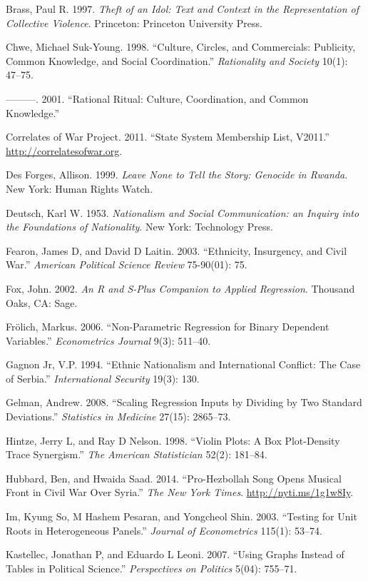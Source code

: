 \documentclass[11pt,article,oneside]{memoir}
\begin{document}
Brass, Paul R. 1997. \emph{Theft of an Idol: Text and Context in the
Representation of Collective Violence}. Princeton: Princeton University
Press.

Chwe, Michael Suk-Young. 1998. ``Culture, Circles, and Commercials:
Publicity, Common Knowledge, and Social Coordination.''
\emph{Rationality and Society} 10(1): 47--75.

---------. 2001. ``Rational Ritual: Culture, Coordination, and Common
Knowledge.''

Correlates of War Project. 2011. ``State System Membership List,
V2011.'' \url{http://correlatesofwar.org}.

Des Forges, Allison. 1999. \emph{Leave None to Tell the Story: Genocide
in Rwanda}. New York: Human Rights Watch.

Deutsch, Karl W. 1953. \emph{Nationalism and Social Communication: an
Inquiry into the Foundations of Nationality}. New York: Technology
Press.

Fearon, James D, and David D Laitin. 2003. ``Ethnicity, Insurgency, and
Civil War.'' \emph{American Political Science Review} 75-90(01): 75.

Fox, John. 2002. \emph{An R and S-Plus Companion to Applied Regression}.
Thousand Oaks, CA: Sage.

Fr{ö}lich, Markus. 2006. ``Non-Parametric Regression for Binary
Dependent Variables.'' \emph{Econometrics Journal} 9(3): 511--40.

Gagnon Jr, V.P. 1994. ``Ethnic Nationalism and International Conflict:
The Case of Serbia.'' \emph{International Security} 19(3): 130.

Gelman, Andrew. 2008. ``Scaling Regression Inputs by Dividing by Two
Standard Deviations.'' \emph{Statistics in Medicine} 27(15): 2865--73.

Hintze, Jerry L, and Ray D Nelson. 1998. ``Violin Plots: A Box
Plot-Density Trace Synergism.'' \emph{The American Statistician} 52(2):
181--84.

Hubbard, Ben, and Hwaida Saad. 2014. ``Pro-Hezbollah Song Opens Musical
Front in Civil War Over Syria.'' \emph{The New York Times}.
\url{http://nyti.ms/1g1w8Iy}.

Im, Kyung So, M Hashem Pesaran, and Yongcheol Shin. 2003. ``Testing for
Unit Roots in Heterogeneous Panels.'' \emph{Journal of Econometrics}
115(1): 53--74.

Kastellec, Jonathan P, and Eduardo L Leoni. 2007. ``Using Graphs Instead
of Tables in Political Science.'' \emph{Perspectives on Politics} 5(04):
755--71.
\end{document}
